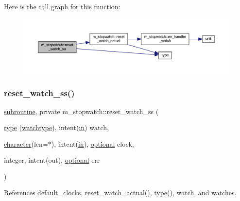 Here is the call graph for this function\+:
\nopagebreak
\begin{figure}[H]
\begin{center}
\leavevmode
\includegraphics[width=350pt]{namespacem__stopwatch_a845b765415e8f229b7f3251a96eaccc6_cgraph}
\end{center}
\end{figure}
\mbox{\label{namespacem__stopwatch_a547e3482f3b6f3ff40e9d2f178f73095}} 
\subsubsection{\texorpdfstring{reset\+\_\+watch\+\_\+ss()}{reset\_watch\_ss()}}
{\footnotesize\ttfamily \hyperlink{M__stopwatch_83_8txt_acfbcff50169d691ff02d4a123ed70482}{subroutine}, private m\+\_\+stopwatch\+::reset\+\_\+watch\+\_\+ss (\begin{DoxyParamCaption}\item[{\hyperlink{stop__watch_83_8txt_a70f0ead91c32e25323c03265aa302c1c}{type} (\hyperlink{structm__stopwatch_1_1watchtype}{watchtype}), intent(\hyperlink{M__journal_83_8txt_afce72651d1eed785a2132bee863b2f38}{in})}]{watch,  }\item[{\hyperlink{option__stopwatch_83_8txt_abd4b21fbbd175834027b5224bfe97e66}{character}(len=$\ast$), intent(\hyperlink{M__journal_83_8txt_afce72651d1eed785a2132bee863b2f38}{in}), \hyperlink{option__stopwatch_83_8txt_aa4ece75e7acf58a4843f70fe18c3ade5}{optional}}]{clock,  }\item[{integer, intent(out), \hyperlink{option__stopwatch_83_8txt_aa4ece75e7acf58a4843f70fe18c3ade5}{optional}}]{err }\end{DoxyParamCaption})\hspace{0.3cm}{\ttfamily [private]}}



References default\+\_\+clocks, reset\+\_\+watch\+\_\+actual(), type(), watch, and watches.

